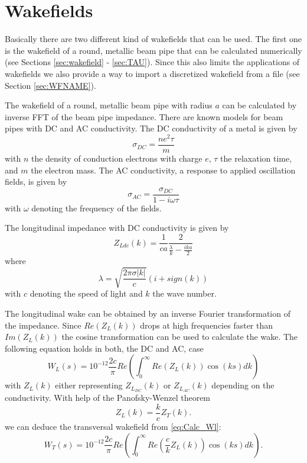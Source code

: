 \chapter{Wakefields}
\label{sec:wakefields}



Basically there are two different kind of wakefields that can be used. The first one is the wakefield of a round, metallic beam pipe that can be calculated numerically (see Sections \ref{sec:wakefield} - \ref{sec:TAU}). Since this also limits the applications of wakefields we also provide a way to import a discretized wakefield from a file (see Section \ref{sec:WFNAME}).

The wakefield of a round, metallic beam pipe with radius $a$ can be calculated by inverse FFT of the beam pipe impedance. There are known models for beam pipes with DC and AC conductivity. The DC conductivity of a metal is given by 
%
\begin{equation}
\sigma_{DC} = \frac{ne^2\tau}{m} \label{eq:dc_cond}
\end{equation}
%
with $n$ the density of conduction electrons with charge $e$, $\tau$ the relaxation time, and $m$ the electron mass. The AC conductivity, a response to applied oscillation fields, is given by 
%
\begin{equation}
\sigma_{AC} = \frac{\sigma_{DC}}{1-i\omega\tau} \label{eq:ac_cond}
\end{equation}
%
with $\omega$ denoting the frequency of the fields.

The longitudinal impedance with DC conductivity is given by
%
\begin{equation}  \label{eq:Z[2]}
 Z_{Ldc}(k) = \dfrac{1}{ca} \dfrac{2}{\frac{\lambda}{k}-\frac{ika}{2}}
\end{equation}
%
where
\begin{equation}
\lambda=\sqrt{\dfrac{2\pi\sigma \vert k\vert}{c}}(i+sign(k))
\end{equation}
%
with $c$ denoting the speed of light and $k$ the wave number. 

The longitudinal wake can be obtained by an inverse Fourier transformation of the impedance. Since $Re(Z_L(k))$ drops at high frequencies faster than $Im(Z_L(k))$ the cosine transformation can be used to calculate the wake. The following equation holds in both, the DC and AC, case
%
\begin{equation} \label{eq:Calc_Wl}
W_L(s)=10^{-12} \dfrac{2c}{\pi}Re\left(\int_0^\infty Re(Z_L(k))\cos (ks)dk\right)
\end{equation}
%
with $Z_L(k)$ either representing $Z_{L_{DC}}(k)$ or $Z_{L_{AC}}(k)$ depending on the conductivity. With help of the Panofsky-Wenzel theorem
%
\begin{equation}
Z_L(k) = \frac{k}{c}Z_T(k).
\end{equation}
%
we can deduce the transversal wakefield from \eqref{eq:Calc_Wl}:
%
\begin{equation} \label{eq:Calc_Wt}
W_T(s)= 10^{-12} \dfrac{2c}{\pi}Re\left(\int_0^\infty Re( \frac{c}{k}Z_L(k))\cos (ks)dk\right).
\end{equation}

